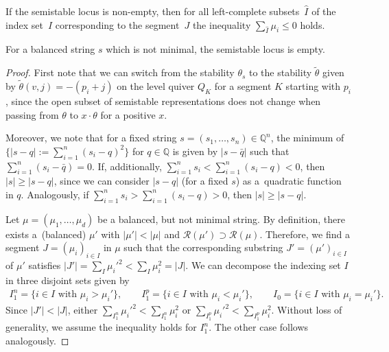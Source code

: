 \documentclass[10pt,a4paper]{amsart}
\newcommand{\R}{\mathcal{R}}
\begin{document}
\begin{Lemma} \label{lem inequ for left-complete}
If the semistable locus  is non-empty, then for all left-complete subsets~$\hat{I}$ of the index set~$I$ corresponding to the segment~$J$ the inequality
$\sum_{\hat{I}} \mu_i \leq 0$
holds.
\end{Lemma}

\begin{Theorem} \label{theo balanced semi-stable empty}
For a balanced string $s$ which is not minimal, the semistable locus  is empty.
\end{Theorem}

\begin{proof}
First note that we can switch from the stability $\theta_s$ to the stability $\tilde{\theta}$ given by $\tilde{\theta}(v,j) = -(p_i +j)$ on the level quiver $Q_K$ for a segment $K$ starting with $p_i$, since the open subset of semistable representations does not change when passing from $\theta$ to $x \cdot \theta$ for a positive $x$.

Moreover, we note that for a fixed string $s = (s_1, \dots, s_n) \in \mathbb{Q}^n$, the minimum of $\big\{|s-q| := \sum_{i=1}^n (s_i - q)^2 \big\}$ for $q \in \mathbb{Q}$ is given by $|s-\bar{q}|$ such that $\sum_{i=1}^n (s_i-\bar{q}) =0$. If, additionally, $\sum_{i=1}^n s_i < \sum_{i=1}^n (s_i-q) <0$, then $|s| \geq |s-q|$, since we can consider $|s-q|$ (for a fixed $s$) as a~quadratic function in $q$. Analogously, if $\sum_{i=1}^n s_i > \sum_{i=1}^n (s_i-q) >0$, then $|s| \geq |s-q|$.

Let $\mu = (\mu_1, \dots, \mu_d)$ be a balanced, but not minimal string. By definition, there exists a~(balanced) $\mu'$ with $|\mu'| < |\mu|$ and $\R(\mu') \supset \R(\mu)$. Therefore, we find a segment $J= (\mu_i)_{i \in I}$ in $\mu$ such that the corresponding substring $J' = (\mu')_{i \in I}$ of $\mu'$ satisfies $|J'|= \sum_I \mu_i'^2 < \sum_I \mu_i^2=|J|$.
We can decompose the indexing set $I$ in three disjoint sets given by
\begin{align*}
I^n_1 = \{ i \in I \text{ with } \mu_i > \mu_i' \} ,\qquad
I^p_1 = \{ i \in I \text{ with } \mu_i <\mu_i' \}, \qquad
I_0 = \{ i \in I \text{ with } \mu_i = \mu_i' \} .
\end{align*}
Since $|J'| < |J|$, either $\sum_{I^n_1} \mu_i'^2 < \sum_{I^n_1} \mu_i^2$ or $\sum_{I^p_1} \mu_i'^2 < \sum_{I^p_1} \mu_i^2$. Without loss of generality, we assume the inequality holds for $I^n_1$. The other case follows analogously.


\end{proof}
\end{document}
